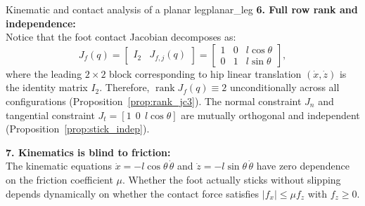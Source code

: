 \documentclass[11pt,a4paper]{article}
\DeclareMathOperator{\rank}{rank}
\begin{document}
\begin{example}{Kinematic and contact analysis of a planar leg}{planar_leg}
\textbf{6. Full row rank and independence:}\\
Notice that the foot contact Jacobian decomposes as:
\[
  J_f(q) = \begin{bmatrix} I_2 & J_{f,j}(q) \end{bmatrix} = \begin{bmatrix} 1 & 0 & l\cos\theta \\ 0 & 1 & l\sin\theta \end{bmatrix},
\]
where the leading $2\times 2$ block corresponding to hip linear translation $(\dot x, \dot z)$ is the identity matrix $I_2$.
Therefore, $\rank J_f(q) \equiv 2$ unconditionally across all configurations (Proposition~\ref{prop:rank_jc3}). The normal constraint $J_n$ and tangential constraint $J_t = [1\ \ 0\ \ l\cos\theta]$ are mutually orthogonal and independent (Proposition~\ref{prop:stick_indep}).

\textbf{7. Kinematics is blind to friction:}\\
The kinematic equations $\dot x = -l\cos\theta\,\dot\theta$ and $\dot z = -l\sin\theta\,\dot\theta$ have zero dependence on the friction coefficient $\mu$. Whether the foot actually sticks without slipping depends dynamically on whether the contact force satisfies $|f_x| \le \mu f_z$ with $f_z \ge 0$.

\begin{center}
\end{center}
\end{example}
\end{document}
